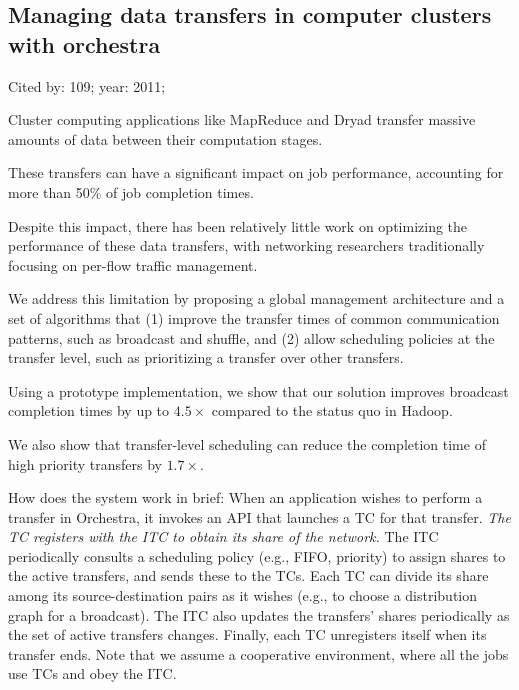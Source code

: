 \documentclass[a4paper,11pt]{article}
\begin{document}
\subsection*{Managing data transfers in computer clusters with orchestra}
{\color{cyan} {\color{magenta} Cited by: 109; year: 2011;}

Cluster computing applications like MapReduce and Dryad 
{\color{red} transfer massive amounts of data between their computation stages}. 

These transfers can have a significant impact on job performance, 
accounting for 
{\color{red} more than 50\% of job completion times}. 

Despite this impact, 
there has been relatively little work on 
optimizing the performance of these data transfers, 
with networking researchers traditionally focusing on per-flow traffic management. 

We address this limitation by 
proposing a {\color{black} global management architecture and a set of algorithms\cite{orchestra}} that 
(1) 
{\color{red} improve the transfer times of common communication patterns}, 
such as broadcast and shuffle, and 
(2) 
{\color{red} allow scheduling policies at the transfer level}, 
such as prioritizing a transfer over other transfers. 

Using a prototype implementation, 
we show that 
our solution 
improves broadcast completion times by up to {\color{red} $4.5 \times$} 
compared to the status quo in Hadoop. 

We also show that
transfer-level scheduling can 
reduce the completion time of high priority transfers by {\color{red} $1.7 \times$}.

}
{\color{blue} \small 


How does the system work in brief:
When an application wishes to perform a transfer in Orchestra,
it invokes an API that launches a TC for that transfer. 
{\color{red} \em The TC registers with the ITC to obtain its share of the network.}
The ITC periodically consults a scheduling policy (e.g., FIFO, priority) to
assign shares to the active transfers, and sends these to the TCs.
Each TC can divide its share among its source-destination pairs as it wishes 
(e.g., to choose a distribution graph for a broadcast).
The ITC also updates the transfers' shares periodically as the set of active transfers changes. 
Finally, each TC unregisters itself when its transfer ends. 
Note that we assume a cooperative environment, where all the jobs use TCs and obey the ITC.	

}
\end{document}
